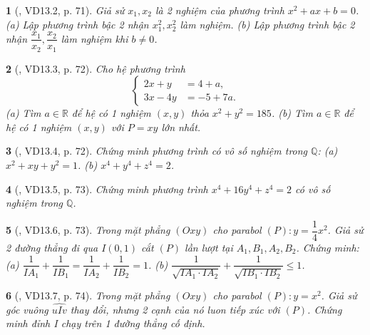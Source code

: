 \documentclass{article}
\newtheorem{baitoan}{}
\begin{document}
\begin{baitoan}[\cite{TLCT_THCS_Toan_9_dai_so}, VD13.2, p. 71]
	Giả sử $x_1,x_2$ là 2 nghiệm của phương trình $x^2 + ax + b = 0$. (a) Lập phương trình bậc 2 nhận $x_1^2,x_2^2$ làm nghiệm. (b) Lập phương trình bậc 2 nhận $\dfrac{x_1}{x_2},\dfrac{x_2}{x_1}$ làm nghiệm khi $b\ne0$.
\end{baitoan}

\begin{baitoan}[\cite{TLCT_THCS_Toan_9_dai_so}, VD13.3, p. 72]
	Cho hệ phương trình
	\begin{equation*}
		\left\{\begin{split}
			2x + y &= 4 + a,\\
			3x - 4y &= -5 + 7a.
		\end{split}\right.
	\end{equation*}
	(a) Tìm $a\in\mathbb{R}$ để hệ có 1 nghiệm $(x,y)$ thỏa $x^2 + y^2 = 185$. (b) Tìm $a\in\mathbb{R}$ để hệ có 1 nghiệm $(x,y)$ với $P = xy$ lớn nhất.
\end{baitoan}

\begin{baitoan}[\cite{TLCT_THCS_Toan_9_dai_so}, VD13.4, p. 72]
	Chứng minh phương trình có vô số nghiệm trong $\mathbb{Q}$: (a) $x^2 + xy + y^2 = 1$. (b) $x^4 + y^4 + z^4 = 2$.
\end{baitoan}

\begin{baitoan}[\cite{TLCT_THCS_Toan_9_dai_so}, VD13.5, p. 73]
	Chứng minh phương trình $x^4 + 16y^4 + z^4 = 2$ có vô số nghiệm trong $\mathbb{Q}$.
\end{baitoan}

\begin{baitoan}[\cite{TLCT_THCS_Toan_9_dai_so}, VD13.6, p. 73]
	Trong mặt phẳng $(Oxy)$ cho parabol $(P):y = \dfrac{1}{4}x^2$. Giả sử 2 đường thẳng đi qua $I(0,1)$ cắt $(P)$ lần lượt tại $A_1,B_1,A_2,B_2$. Chứng minh: (a) $\dfrac{1}{IA_1} + \dfrac{1}{IB_1} = \dfrac{1}{IA_2} + \dfrac{1}{IB_2} = 1$. (b) $\dfrac{1}{\sqrt{IA_1\cdot IA_2}} + \dfrac{1}{\sqrt{IB_1\cdot IB_2}}\le1$.
\end{baitoan}

\begin{baitoan}[\cite{TLCT_THCS_Toan_9_dai_so}, VD13.7, p. 74]
	Trong mặt phẳng $(Oxy)$ cho parabol $(P):y = x^2$. Giả sử góc vuông $\widehat{uIv}$ thay đổi, nhưng 2 cạnh của nó luon tiếp xúc với $(P)$. Chứng minh đỉnh I chạy trên 1 đường thẳng cố định.
\end{baitoan}
\end{document}
